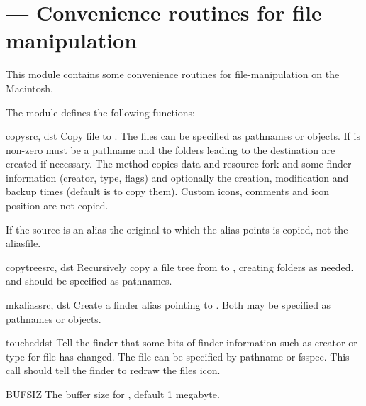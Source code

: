 \section{ ---
         Convenience routines for file manipulation}



This module contains some convenience routines for file-manipulation
on the Macintosh.

The  module defines the following functions:


\begin{funcdesc}{copy}{src, dst}
Copy file  to . The files can be specified as
pathnames or  objects. If  is non-zero
 must be a pathname and the folders leading to the
destination are created if necessary.  The method copies data and
resource fork and some finder information (creator, type, flags) and
optionally the creation, modification and backup times (default is to
copy them). Custom icons, comments and icon position are not copied.

If the source is an alias the original to which the alias points is
copied, not the aliasfile.
\end{funcdesc}

\begin{funcdesc}{copytree}{src, dst}
Recursively copy a file tree from  to , creating
folders as needed.  and  should be specified as
pathnames.
\end{funcdesc}

\begin{funcdesc}{mkalias}{src, dst}
Create a finder alias  pointing to . Both may be
specified as pathnames or  objects.
\end{funcdesc}

\begin{funcdesc}{touched}{dst}
Tell the finder that some bits of finder-information such as creator
or type for file  has changed. The file can be specified by
pathname or fsspec. This call should tell the finder to redraw the
files icon.
\end{funcdesc}

\begin{datadesc}{BUFSIZ}
The buffer size for , default 1 megabyte.
\end{datadesc}

